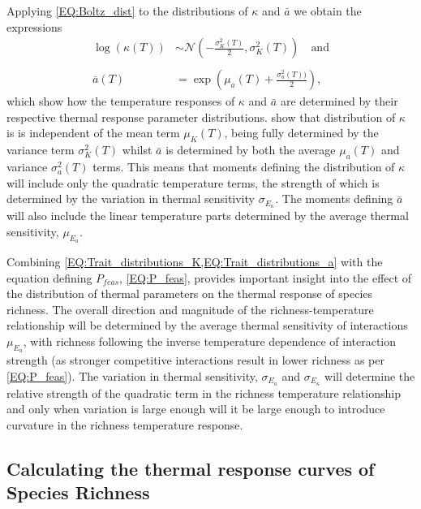 \documentclass{article}
\begin{document}
Applying \cref{EQ:Boltz_dist} to the distributions of $\kappa$ and $\bar{a}$ we obtain the expressions
\begin{align} 
        \log(\kappa(T)) &\sim \mathcal{N}\left( -\frac{\sigma_{K}^2(T)}{2} , \sigma_{K}^2(T) \right) \quad \text{and} \label{EQ:Trait_distributions_K} \\ \nonumber \\
        \bar{a}(T) &= \exp \left(\mu_a(T) + \frac{\sigma_a^2(T))}{2} \right) \label{EQ:Trait_distributions_a},
\end{align}
which show how the temperature responses of $\kappa$ and $\bar{a}$ are determined by their respective thermal response parameter distributions.  show that distribution of $\kappa$ is is independent of the mean term $\mu_{K}(T)$, being fully determined by the variance term $\sigma_{K}^2(T)$ whilst $\bar{a}$ is determined by both the average $\mu_a(T)$ and variance $\sigma_a^2(T)$ terms. This means that moments defining the distribution of $\kappa$ will include only the quadratic temperature terms, the strength of which is determined by the variation in thermal sensitivity $\sigma_{E_{\kappa}}$. The moments defining $\bar{a}$ will also include the linear temperature parts determined by the average thermal sensitivity, $\mu_{E_a}$. 

Combining \cref{EQ:Trait_distributions_K,EQ:Trait_distributions_a} with the equation defining $P_{feas}$, \cref{EQ:P_feas}, provides important insight into the effect of the distribution of thermal parameters on the thermal response of species richness. The overall direction and magnitude of the richness-temperature relationship will be determined by the average thermal sensitivity of interactions $\mu_{E_a}$, with richness following the inverse temperature dependence of interaction strength (as stronger competitive interactions result in lower richness as per \cref{EQ:P_feas}). The variation in thermal sensitivity, $\sigma_{E_a}$ and $\sigma_{E_{\kappa}}$ will determine the relative strength of the quadratic term in the richness temperature relationship and only when variation is large enough will it be large enough to introduce curvature in the richness temperature response.


\subsection*{Calculating the thermal response curves of Species Richness} \label{SEC:Temp_SP_num}
\end{document}
